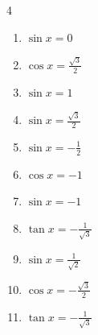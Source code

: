 \begin{multicols}{4}
\begin{enumerate}

  \item $\displaystyle \sin{x}  = 0$


  \item $\displaystyle \cos{x}  = \frac{\sqrt{3}}{2}$


  \item $\displaystyle \sin{x}  = 1$


  \item $\displaystyle \sin{x}  = \frac{\sqrt{3}}{2}$


  \item $\displaystyle \sin{x}  = -\frac{1}{2}$


  \item $\displaystyle \cos{x}  = -1$


  \item $\displaystyle \sin{x}  = -1$


  \item $\displaystyle \tan{x}  = -\frac{1}{\sqrt{3}}$


  \item $\displaystyle \sin{x}  = \frac{1}{\sqrt{2}}$


  \item $\displaystyle \cos{x}  = -\frac{\sqrt{3}}{2}$


  \item $\displaystyle \tan{x}  = -\frac{1}{\sqrt{3}}$



\end{enumerate}
\end{multicols}
